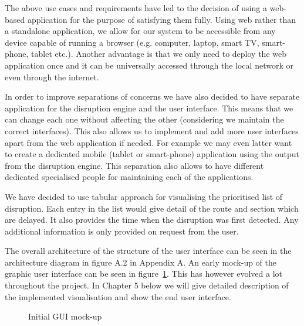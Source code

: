 The above use cases and requirements have led to the decision of using a web-based application for the purpose of satisfying them fully. Using web rather than a standalone application, we allow for our system to be accessible from any device capable of running a browser (e.g. computer, laptop, smart TV, smart-phone, tablet etc.). Another advantage is that we only need to deploy the web application once and it can be universally accessed through the local network or even through the internet.

In order to improve separations of concerns we have also decided to have separate application for the disruption engine and the user interface. This means that we can change each one without affecting the other (considering we maintain the correct interfaces). This also allows us to implement and add more user interfaces apart from the web application if needed. For example we may even latter want to create a dedicated mobile (tablet or smart-phone) application using the output from the disruption engine. This separation also allows to have different dedicated specialised people for maintaining each of the applications.

We have decided to use tabular approach for visualising the prioritised list of disruption. Each entry in the list would give detail of the route and section which are delayed. It also provides the time when the disruption was first detected. Any additional information is only provided on request from the user.

The overall architecture of the structure of the user interface can be seen in the architecture diagram in figure A.2 in Appendix A. An early mock-up of the graphic user interface can be seen in figure~\ref{fig:guiProposal}. This has however evolved a lot throughout the project. In Chapter 5 below we will give detailed description of the implemented visualisation and show the end user interface.


\begin{figure}[ht]
	\caption{Initial GUI mock-up}
	\label{fig:guiProposal}
\end{figure}
